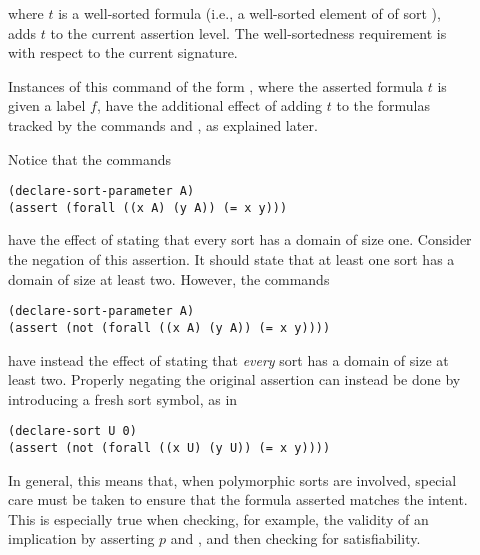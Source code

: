 \begin{description}
%
\item[]
where $t$ is a well-sorted formula 
(i.e., a well-sorted element of  of sort ),
adds $t$ to the current assertion level.
The well-sortedness requirement is with respect to the current signature.

Instances of this command of the form , 
where the asserted formula $t$ is given a label $f$, 
have the additional effect of adding $t$ to the formulas tracked 
by the commands  and , as explained later.

\begin{newver}
\begin{remark}
Notice that the commands
\begin{lstlisting}
(declare-sort-parameter A)
(assert (forall ((x A) (y A)) (= x y)))
\end{lstlisting}
have the effect of stating that every sort has a domain of size one.
Consider the negation of this assertion.  It should state that at least one sort has a
domain of size at least two.
However, the commands
\begin{lstlisting}
(declare-sort-parameter A)
(assert (not (forall ((x A) (y A)) (= x y))))
\end{lstlisting}
have instead the effect of stating that \emph{every} sort has a domain of size 
at least two.
Properly negating the original assertion can instead be done by introducing
a fresh sort symbol, as in
\begin{lstlisting}
(declare-sort U 0)
(assert (not (forall ((x U) (y U)) (= x y))))
\end{lstlisting}
In general, this means that, when polymorphic sorts are involved,
special care must be taken to ensure that the formula asserted matches the
intent.  This is especially true when checking, for example, the validity 
of an implication  
by asserting $p$ and , and then checking for satisfiability.
\end{remark}
\end{newver}


\end{description}
